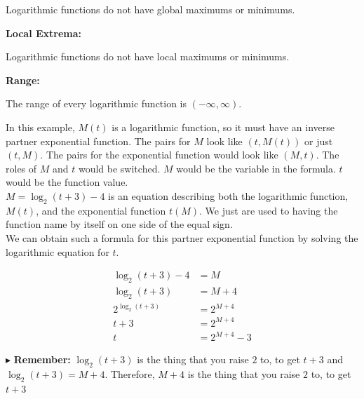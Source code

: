 \documentclass{ximera}
\begin{document}
\begin{formuala}
\begin{example}
Logarithmic functions do not have global maximums or minimums. 


\textbf{Local Extrema:} 

Logarithmic functions do not have local maximums or minimums. 



\textbf{Range:} 

The range of every logarithmic function is $(-\infty, \infty)$.






\end{example}

























In this example, $M(t)$ is a logarithmic function, so it must have an inverse partner exponential function.  The pairs for $M$ look like $(t, M(t))$ or just $(t,M)$. The pairs for the exponential function would look like $(M, t)$.  The roles of $M$ and $t$ would be switched. $M$ would be the variable in the formula. $t$ would be the function value.\\


$M = \log_2(t+3) - 4$ is an equation describing both the logarithmic function, $M(t)$, and the exponential function $t(M)$.  We just are used to having the function name by itself on one side of the equal sign. \\


We can obtain such a formula for this partner exponential function by solving the logarithmic equation for $t$.





\begin{align*}
\log_2(t+3) - 4 & = M \\
\log_2(t+3) & = M + 4 \\
2^{\log_2(t+3)} & = 2^{M+4} \\
t+3 & = 2^{M+4} \\
t & = 2^{M+4} - 3
\end{align*}


$\blacktriangleright$ \textbf{Remember:} $\log_2(t+3)$ is the thing that you raise $2$ to, to get $t+3$ and $\log_2(t+3) = M+4$.  Therefore, $M+4$ is the thing that you raise $2$ to, to get $t+3$






\end{formuala}
\end{document}
